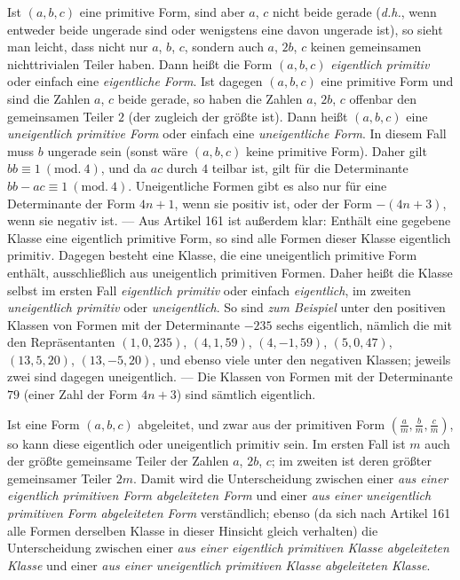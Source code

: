 Ist $(a,b,c)$ eine primitive Form, sind aber $a$, $c$ nicht beide gerade (\textit{d.h.}, wenn entweder beide ungerade sind oder wenigstens eine davon ungerade ist), so sieht man leicht, dass nicht nur $a$, $b$, $c$, sondern auch $a$, $2b$, $c$ keinen gemeinsamen nichttrivialen Teiler haben. Dann heißt die Form $(a,b,c)$ \textit{eigentlich primitiv} oder einfach eine \textit{eigentliche Form}. Ist dagegen $(a,b,c)$ eine primitive Form und sind die Zahlen $a$, $c$ beide gerade, so haben die Zahlen $a$, $2b$, $c$ offenbar den gemeinsamen Teiler $2$ (der zugleich der größte ist). Dann heißt $(a,b,c)$ eine \textit{uneigentlich primitive Form} oder einfach eine \textit{uneigentliche Form}. In diesem Fall muss $b$ ungerade sein (sonst wäre $(a,b,c)$ keine primitive Form). Daher gilt $bb\equiv1\ (\mathrm{mod.}\ 4)$, und da $ac$ durch $4$ teilbar ist, gilt für die Determinante $bb-ac\equiv1\ (\mathrm{mod.}\ 4)$. Uneigentliche Formen gibt es also nur für eine Determinante der Form $4n+1$, wenn sie positiv ist, oder der Form $-(4n+3)$, wenn sie negativ ist. --- Aus Artikel 161 ist außerdem klar: Enthält eine gegebene Klasse eine eigentlich primitive Form, so sind alle Formen dieser Klasse eigentlich primitiv. Dagegen besteht eine Klasse, die eine uneigentlich primitive Form enthält, ausschließlich aus uneigentlich primitiven Formen. Daher heißt die Klasse selbst im ersten Fall \textit{eigentlich primitiv} oder einfach \textit{eigentlich}, im zweiten \textit{uneigentlich primitiv} oder \textit{uneigentlich}. So sind \textit{zum Beispiel} unter den positiven Klassen von Formen mit der Determinante $-235$ sechs eigentlich, nämlich die mit den Repräsentanten $(1,0,235)$, $(4,1,59)$, $(4,-1,59)$, $(5,0,47)$, $(13,5,20)$, $(13,-5,20)$, und ebenso viele unter den negativen Klassen; jeweils zwei sind dagegen uneigentlich. --- Die Klassen von Formen mit der Determinante $79$ (einer Zahl der Form $4n+3$) sind sämtlich eigentlich.

Ist eine Form $(a,b,c)$ abgeleitet, und zwar aus der primitiven Form $\left(\frac{a}{m},\frac{b}{m},\frac{c}{m}\right)$, so kann diese eigentlich oder uneigentlich primitiv sein. Im ersten Fall ist $m$ auch der größte gemeinsame Teiler der Zahlen $a$, $2b$, $c$; im zweiten ist deren größter gemeinsamer Teiler $2m$. Damit wird die Unterscheidung zwischen einer \textit{aus einer eigentlich primitiven Form abgeleiteten Form} und einer \textit{aus einer uneigentlich primitiven Form abgeleiteten Form} verständlich; ebenso (da sich nach Artikel 161 alle Formen derselben Klasse in dieser Hinsicht gleich verhalten)
die Unterscheidung zwischen einer \textit{aus einer eigentlich primitiven Klasse abgeleiteten Klasse} und einer \textit{aus einer uneigentlich primitiven Klasse abgeleiteten Klasse}.

